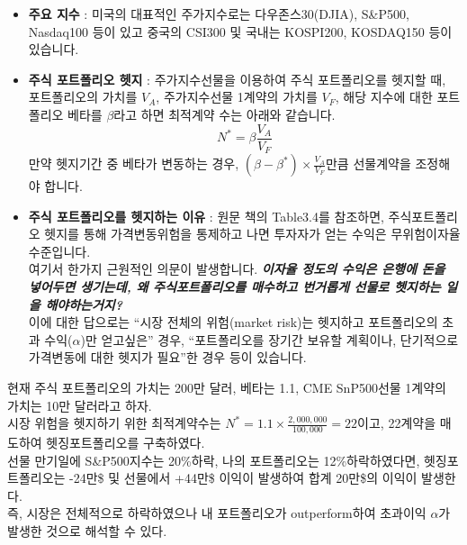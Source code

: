 \documentclass[
  letterpaper,
  DIV=11,
  numbers=noendperiod]{scrreprt}
\begin{document}
\begin{itemize}
\item
  \textbf{주요 지수} : 미국의 대표적인 주가지수로는 다우존스30(DJIA),
  S\&P500, Nasdaq100 등이 있고 중국의 CSI300 및 국내는 KOSPI200,
  KOSDAQ150 등이 있습니다.
\item
  \textbf{주식 포트폴리오 헷지} : 주가지수선물을 이용하여 주식
  포트폴리오를 헷지할 때, 포트폴리오의 가치를 \(V_A\), 주가지수선물
  1계약의 가치를 \(V_F\), 해당 지수에 대한 포트폴리오 베타를
  \(\beta\)라고 하면 최적계약 수는 아래와 같습니다.
  \[N^*=\beta\frac{V_A}{V_F}\] 만약 헷지기간 중 베타가 변동하는 경우,
  \((\beta - \beta ^*)\times\frac{V_A}{V_F}\)만큼 선물계약을 조정해야
  합니다.
\item
  \textbf{주식 포트폴리오를 헷지하는 이유} : 원문 책의 Table3.4를
  참조하면, 주식포트폴리오 헷지를 통해 가격변동위험을 통제하고 나면
  투자자가 얻는 수익은 무위험이자율 수준입니다.\\
  여기서 한가지 근원적인 의문이 발생합니다. \textbf{\emph{이자율 정도의
  수익은 은행에 돈을 넣어두면 생기는데, 왜 주식포트폴리오를 매수하고
  번거롭게 선물로 헷지하는 일을 해야하는거지?}}\\
  이에 대한 답으로는 ``시장 전체의 위험(market risk)는 헷지하고
  포트폴리오의 초과 수익(\(\alpha\))만 얻고싶은'' 경우, ``포트폴리오를
  장기간 보유할 계획이나, 단기적으로 가격변동에 대한 헷지가 필요''한
  경우 등이 있습니다.
\end{itemize}

\begin{tcolorbox}[enhanced jigsaw, titlerule=0mm, bottomtitle=1mm, left=2mm, title=\textcolor{quarto-callout-note-color}{\faInfo}\hspace{0.5em}{시장위험 헷지 예시}, toptitle=1mm, bottomrule=.15mm, colframe=quarto-callout-note-color-frame, breakable, opacityback=0, rightrule=.15mm, opacitybacktitle=0.6, coltitle=black, colback=white, arc=.35mm, colbacktitle=quarto-callout-note-color!10!white, toprule=.15mm, leftrule=.75mm]

현재 주식 포트폴리오의 가치는 200만 달러, 베타는 1.1, CME SnP500선물
1계약의 가치는 10만 달러라고 하자.\\
시장 위험을 헷지하기 위한 최적계약수는
\(N^*=1.1\times\frac{2,000,000}{100,000}=22\)이고, 22계약을 매도하여
헷징포트폴리오를 구축하였다.\\
선물 만기일에 S\&P500지수는 20\%하락, 나의 포트폴리오는
12\%하락하였다면, 헷징포트폴리오는 -24만\$ 및 선물에서 +44만\$ 이익이
발생하여 합계 20만\$의 이익이 발생한다.\\
즉, 시장은 전체적으로 하락하였으나 내 포트폴리오가 outperform하여
초과이익 \(\alpha\)가 발생한 것으로 해석할 수 있다.

\end{tcolorbox}
\end{document}
